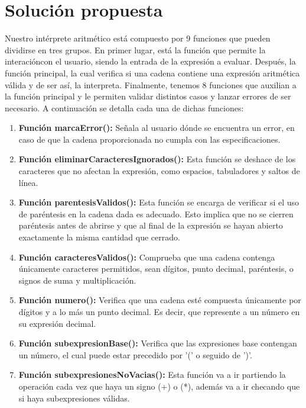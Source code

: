 \documentclass{article}
\begin{document}
\section{Solución propuesta}
\normalsize Nuestro intérprete aritmético está compuesto por 9 funciones que pueden dividirse en tres grupos. En primer lugar, está la función que permite la interacióncon el usuario, siendo la entrada de la expresión a evaluar. Después,  la función principal,  la cual  verifica si una cadena contiene una expresión aritmética válida y de ser así, la interpreta. Finalmente, tenemos 8 funciones que auxilian a la función principal y le permiten validar distintos casos y lanzar errores de ser necesario. A continuación se detalla   cada una de dichas funciones:
\begin{enumerate}
    \item \textbf{Función marcaError():} Señala  al usuario  dónde se encuentra un error, en caso de que la cadena proporcionada  no cumpla con las especificaciones.
    
    \item \textbf{Función eliminarCaracteresIgnorados():} Esta función se deshace  de los caracteres que no afectan la expresión, como espacios, tabuladores y saltos de línea. 
    
    \item \textbf{Función parentesisValidos():} Esta función se encarga de verificar si el uso de paréntesis en la cadena dada es adecuado. Esto implica que no se cierren paréntesis antes de abrirse y que al final de la expresión se hayan abierto exactamente la misma cantidad que cerrado.
    
    \item \textbf{Función caracteresValidos():} Comprueba que una cadena contenga únicamente caracteres permitidos, sean dígitos, punto decimal, paréntesis, o signos de suma y multiplicación.
    
    \item \textbf{Función numero():} Verifica que una cadena esté compuesta únicamente por dígitos y a lo más un punto decimal. Es decir, que represente a un número en su expresión decimal.
    
    \item \textbf{Función subexpresionBase():} Verifica que las expresiones base contengan un número, el cual puede estar precedido por '(' o seguido de ')'.
    
    \item \textbf{Función subexpresionesNoVacias():} Esta función va a ir partiendo la operación cada vez que haya un signo (+) o (*), además va a ir checando que si haya subexpresiones válidas.
    

\end{enumerate}
\end{document}
